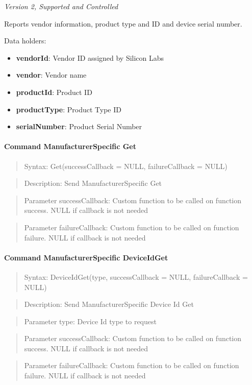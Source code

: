 \textit{Version 2, Supported and Controlled}
\newline

Reports vendor information, product type and ID and device serial number.
\newline

\noindent
Data holders:

\begin{itemize}
\item \textbf{vendorId}: Vendor ID assigned by Silicon Labs
\item \textbf{vendor}: Vendor name
\item \textbf{productId}: Product ID
\item \textbf{productType}: Product Type ID
\item \textbf{serialNumber}: Product Serial Number
\end{itemize}

\paragraph{Command ManufacturerSpecific Get}
\begin{quote}Syntax: Get(successCallback = NULL, failureCallback = NULL)\end{quote}
\begin{quote}Description: Send ManufacturerSpecific Get\end{quote}
\begin{quote}Parameter successCallback: Custom function to be called on function success. NULL if callback is not needed\end{quote}
\begin{quote}Parameter failureCallback: Custom function to be called on function failure. NULL if callback is not needed\end{quote}


\paragraph{Command ManufacturerSpecific DeviceIdGet}
\begin{quote}Syntax: DeviceIdGet(type, successCallback = NULL, failureCallback = NULL)\end{quote}
\begin{quote}Description: Send ManufacturerSpecific Device Id Get\end{quote}
\begin{quote}Parameter type: Device Id type to request\end{quote}
\begin{quote}Parameter successCallback: Custom function to be called on function success. NULL if callback is not needed\end{quote}
\begin{quote}Parameter failureCallback: Custom function to be called on function failure. NULL if callback is not needed\end{quote}



